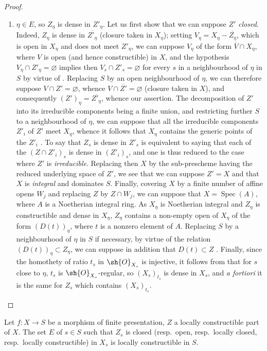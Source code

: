 \begin{proof}
\begin{enumerate}[label=\upshape{$\arabic{enumi}^\circ$}]
  \item\label{IV.9.5.3.case2} $\eta\in E$, so $Z_\eta$ is dense in $Z'_\eta$.
  Let us first show that we can suppose $Z'$ \emph{closed}.
  Indeed, $Z_\eta$ is dense in $\overline{Z'_\eta}$ (closure taken in $X_\eta$); setting $V_\eta=X_\eta-\overline{Z_\eta}$, which is open in $X_\eta$ and does not meet $Z'_\eta$, we can suppose $V_\eta$ of the form $\overline{V}\cap X_\eta$, where $V$ is open (and hence constructible) in $X$, and the hypothesis $V_\eta\cap Z'_\eta=\varnothing$ implies then $V_s\cap Z'_s=\varnothing$ for every $s$ in a neighbourhood of $\eta$ in $S$ by virtue of .
  Replacing $S$ by an open neighbourhood of $\eta$, we can therefore suppose $V\cap Z'=\varnothing$, whence $V\cap\overline{Z'}=\varnothing$ (closure taken in $X$), and consequently $(Z')_\eta=\overline{Z'_\eta}$, whence our assertion.
  The decomposition of $Z'$ into its irreducible components being a finite union, and restricting further $S$ to a neighbourhood of $\eta$, we can suppose that all the irreducible components $Z'_i$ of $Z'$ meet $X_\eta$, whence it follows that $X_\eta$ contains the generic points of the $Z'_i$ .
  To say that $Z_s$ is dense in $Z'_s$ is equivalent to saying that each of the $(Z\cap Z'_i)_s$ is dense in $(Z'_i)_s$, and one is thus reduced to the case where $Z'$ is \emph{irreducible}.
  Replacing then $X$ by the sub-prescheme having the reduced underlying space of $Z'$, we see that we can suppose $Z'=X$ and that $X$ is \emph{integral} and dominates $S$.
  Finally, covering $X$ by a finite number of affine opens $W_j$ and replacing $Z$ by $Z\cap W_j$, we can suppose that $X=\operatorname{Spec}(A)$, where $A$ is a Noetherian integral ring.
  As $X_\eta$ is Noetherian integral and $Z_\eta$ is constructible and dense in $X_\eta$, $Z_\eta$ contains a non-empty open of $X_\eta$ of the form $(D(t))_\eta$, where $t$ is a nonzero element of $A$.
  Replacing $S$ by a neighbourhood of $\eta$ in $S$ if necessary, by virtue of the relation $(D(t))_\eta\subset Z_\eta$, we can suppose in addition that $D(t)\subset Z$ .
  Finally, since the homothety of ratio $t_s$ in $\sh{O}_{X_s}$ is injective, it follows from  that for $s$ close to $\eta$, $t_s$ is $\sh{O}_{X_s}$-regular, so $(X_s)_{t_s}$ is dense in $X_s$, and \emph{a fortiori} it is the same for $Z_s$ which contains $(X_s)_{t_s}$.
\end{enumerate}
\end{proof}

\begin{corollary}[9.5.4]
\label{IV.9.5.4}
Let $f:X\to S$ be a morphism of finite presentation, $Z$ a locally constructible part of $X$.
The set $E$ of $s\in S$ such that $Z_s$ is closed (resp.\ open, resp.\ locally closed, resp.\ locally constructible) in $X_s$ is locally constructible in $S$.
\end{corollary}

